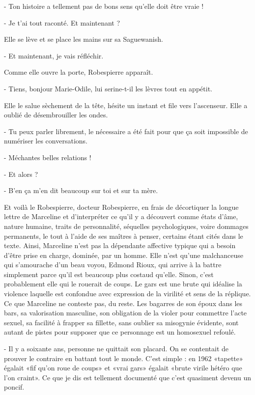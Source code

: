 - Ton histoire a tellement pas de bons sens qu’elle doit être vraie !

- Je t’ai tout raconté. Et maintenant ?

Elle se lève et se place les mains sur sa Saguewanish.

- Et maintenant, je vais réfléchir.

Comme elle ouvre la porte, Robespierre apparaît.

- Tiens, bonjour Marie-Odile, lui serine-t-il les lèvres tout en appétit.

Elle le salue sèchement de la tête, hésite un instant et file vers l’ascenseur. Elle a oublié de désembrouiller les ondes.

- Tu peux parler librement, le nécessaire a été fait pour que ça soit impossible de numériser les conversations.

- Méchantes belles relations !

- Et alors ?

- B’en ça m’en dit beaucoup sur toi et sur ta mère.

Et voilà le Robespierre, docteur Robespierre, en frais de décortiquer la longue lettre de Marceline et d’interpréter ce qu’il y a découvert comme états d’âme, nature humaine, traits de personnalité, séquelles psychologiques, voire dommages permanents, le tout à l’aide de ses maîtres à penser, certains étant cités dans le texte. Ainsi, Marceline n’est pas la dépendante affective typique qui a besoin d’être prise en charge, dominée, par un homme. Elle n’est qu’une malchanceuse qui s’amourache d’un beau voyou, Edmond Rioux, qui arrive à la battre simplement parce qu’il est beaucoup plus costaud qu’elle. Sinon, c’est probablement elle qui le rouerait de coups. Le gars est une brute qui idéalise la violence laquelle est confondue avec expression de la virilité et sens de la réplique. Ce que Marceline ne conteste pas, du reste. Les bagarres de son époux dans les bars, sa valorisation masculine, son obligation de la violer pour commettre l’acte sexuel, sa facilité à frapper sa fillette, sans oublier sa misogynie évidente, sont autant de pistes pour supposer que ce personnage est un homosexuel refoulé.

- Il y a soixante ans, personne ne quittait son placard. On se contentait de prouver le contraire en battant tout le monde. C’est simple : en 1962 «tapette» égalait «fif qu’on roue de coups» et «vrai gars» égalait «brute virile hétéro que l’on craint». Ce que je dis est tellement documenté que c’est quasiment devenu un poncif.

